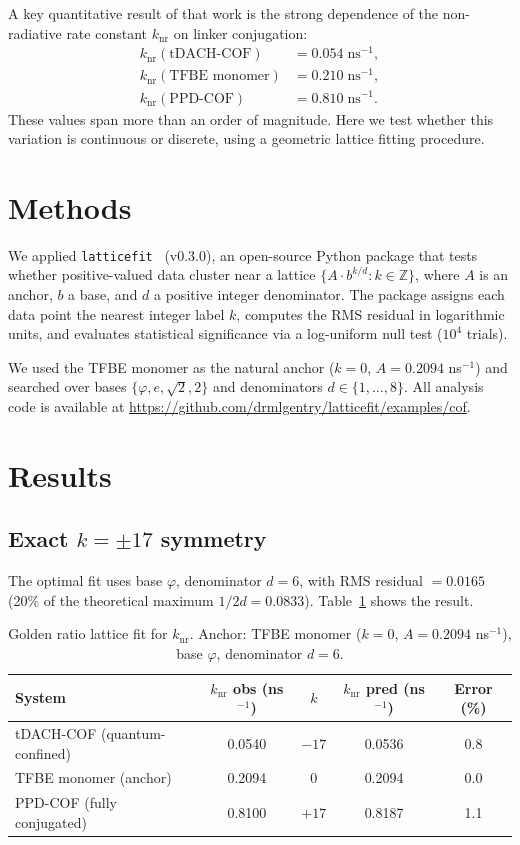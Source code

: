 \documentclass[11pt,a4paper]{article}
\begin{document}
A key quantitative result of that work is the strong dependence of the
non-radiative rate constant $k_{\mathrm{nr}}$ on linker conjugation:
\begin{align*}
k_{\mathrm{nr}}(\text{tDACH-COF}) &= 0.054\;\text{ns}^{-1},\\
k_{\mathrm{nr}}(\text{TFBE monomer}) &= 0.210\;\text{ns}^{-1},\\
k_{\mathrm{nr}}(\text{PPD-COF}) &= 0.810\;\text{ns}^{-1}.
\end{align*}
These values span more than an order of magnitude. Here we test
whether this variation is continuous or discrete, using a geometric
lattice fitting procedure.

\section{Methods}

We applied \texttt{latticefit}~\cite{Gentry:LatticeFit} (v0.3.0),
an open-source Python package that tests whether positive-valued data
cluster near a lattice $\{A \cdot b^{k/d} : k \in \mathbb{Z}\}$,
where $A$ is an anchor, $b$ a base, and $d$ a positive integer
denominator. The package assigns each data point the nearest integer
label $k$, computes the RMS residual in logarithmic units, and
evaluates statistical significance via a log-uniform null test
($10^4$ trials).

We used the TFBE monomer as the natural anchor ($k = 0$, $A = 0.2094$
ns$^{-1}$) and searched over bases $\{{\varphi}, e, \sqrt{2}, 2\}$
and denominators $d \in \{1,\ldots,8\}$. All analysis code is
available at \url{https://github.com/drmlgentry/latticefit/examples/cof}.

\section{Results}

\subsection{Exact $k = \pm 17$ symmetry}

The optimal fit uses base $\varphi$, denominator $d = 6$,
with RMS residual $= 0.0165$ (20\% of the theoretical maximum
$1/2d = 0.0833$). Table~\ref{tab:fit} shows the result.

\begin{table}[h]
\centering
\caption{Golden ratio lattice fit for $k_{\mathrm{nr}}$.
  Anchor: TFBE monomer ($k=0$, $A = 0.2094$ ns$^{-1}$),
  base $\varphi$, denominator $d=6$.}
\label{tab:fit}
\begin{tabular}{lcccc}
\toprule
System & {$k_{\mathrm{nr}}$ obs (ns$^{-1}$)} & $k$ &
  {$k_{\mathrm{nr}}$ pred (ns$^{-1}$)} & {Error (\%)} \\
\midrule
tDACH-COF (quantum-confined) & 0.0540 & $-17$ & 0.0536 & 0.8 \\
TFBE monomer (anchor)        & 0.2094 & $0$   & 0.2094 & 0.0 \\
PPD-COF (fully conjugated)   & 0.8100 & $+17$ & 0.8187 & 1.1 \\
\bottomrule
\end{tabular}
\end{table}
\end{document}
